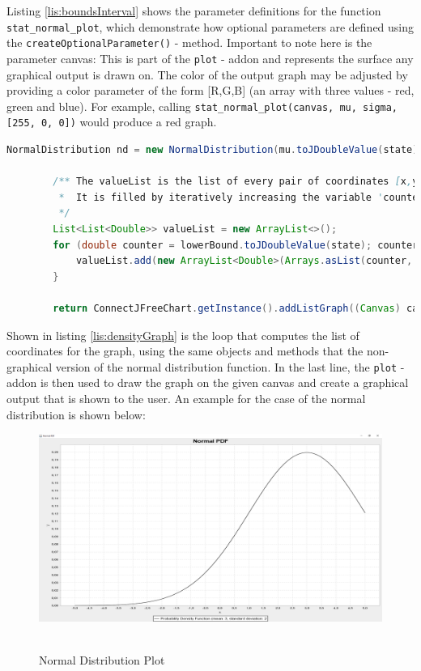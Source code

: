 Listing \ref{lis:boundsInterval} shows the parameter definitions for the function \lstinline{stat_normal_plot}, which demonstrate how optional parameters are defined using the \lstinline{createOptionalParameter()} - method. Important to note here is the parameter canvas: This is part of the \lstinline{plot} - addon and represents the surface any graphical output is drawn on. The color of the output graph may be adjusted by providing a color
parameter of the form [R,G,B] (an array with three values - red, green and blue). For example, calling \lstinline{stat_normal_plot(canvas, mu, sigma, [255, 0, 0])} would produce a red graph. 
\begin{center}
	\begin{lstlisting}[caption={Computation of propability density graph for Normal Distributions}, language={java}, label=lis:densityGraph]
		NormalDistribution nd = new NormalDistribution(mu.toJDoubleValue(state), sigma.toJDoubleValue(state));

        /** The valueList is the list of every pair of coordinates [x,y] that the graph consists of.
         *  It is filled by iteratively increasing the variable 'counter' (x), and calculating the density for every new value of 'counter' (y).
         */
        List<List<Double>> valueList = new ArrayList<>();
        for (double counter = lowerBound.toJDoubleValue(state); counter < upperBound.toJDoubleValue(state); counter += interval.toJDoubleValue(state)) {
            valueList.add(new ArrayList<Double>(Arrays.asList(counter, nd.density(counter))));
        }

        return ConnectJFreeChart.getInstance().addListGraph((Canvas) canvas, valueList, "Probability Density Function (mean: " + mu.toString() + ", standard deviation: " + sigma.toString(), Defaults.DEFAULT_COLOR_SCHEME, false);
	\end{lstlisting}
\end{center}

Shown in listing \ref{lis:densityGraph} is the loop that computes the list of coordinates for the graph, using the same objects and methods that the non-graphical version of the normal distribution function. In the last line, the \lstinline{plot} - addon is then used to draw the graph on the given canvas and create a graphical output that is shown to the user. An example for the case of the normal distribution is shown below:

\begin{figure}[h]
    \centering
    \includegraphics[width=1\textwidth]{Figures/implemented_functions/normal_pdf}~\\
    \caption{Normal Distribution Plot}
    \label{fig:normalDistPlot}
\end{figure}
